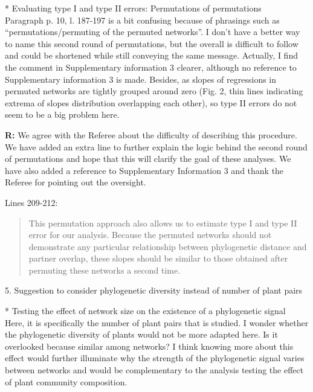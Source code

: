 \documentclass[12pt]{letter}
\newenvironment{refquote}{\bigskip \begin{it}}{\end{it}\smallskip}
\begin{document}
		\begin{refquote}
			* Evaluating type I and type II errors: Permutations of permutations\\
			Paragraph p. 10, l. 187-197 is a bit confusing because of phrasings such as “permutations/permuting of the permuted networks”. I don't have a better way to name this second round of permutations, but the overall is difficult to follow and could be shortened while still conveying the same message.
			Actually, I find the comment in Supplementary information 3 clearer, although no reference to Supplementary information 3 is made.
			Besides, as slopes of regressions in permuted networks are tightly grouped around zero (Fig. 2, thin lines indicating 
			extrema of slopes distribution overlapping each other), so type II errors do not seem to be a big problem here.
		\end{refquote}


		\textbf{R:} We agree with the Referee about the difficulty of describing this procedure. We have added an extra line to further explain the logic behind the second round of permutations and hope that this will clarify the goal of these analyses. We have also added a reference to Supplementary Information 3 and thank the Referee for pointing out the oversight.


		Lines 209-212:

		\begin{quotation}

			This permutation approach also allows us to estimate type I and type II 
			error for our analysis. Because the permuted networks should not demonstrate any particular relationship between phylogenetic distance and partner overlap, these slopes should be similar to those obtained after permuting these networks a second time.

		\end{quotation}


	5. Suggestion to consider phylogenetic diversity instead of number of plant pairs

		\begin{refquote}
			* Testing the effect of network size on the existence of a phylogenetic signal\\
			Here, it is specifically the number of plant pairs that is studied. I wonder whether the phylogenetic diversity of plants would not be more adapted here. Is it overlooked because similar among networks?
			I think knowing more about this effect would further illuminate why the strength of the phylogenetic signal varies between networks and would be complementary to the analysis testing the effect of plant community composition.
		\end{refquote}
\end{document}
